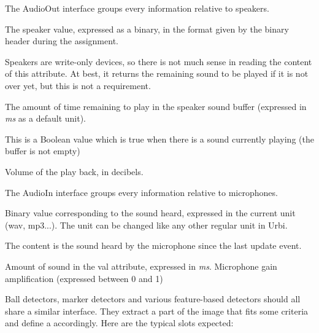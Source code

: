 The AudioOut interface groups every information relative to speakers.

\begin{slots}
  {%
    The speaker value, expressed as a binary, in the format given by
    the binary header during the assignment.

    Speakers are write-only devices, so there is not much sense in
    reading the content of this attribute. At best, it returns the
    remaining sound to be played if it is not over yet, but this is
    not a requirement.%
  }

  {%
    The amount of time remaining to play in the speaker sound buffer
    (expressed in \textit{ms} as a default unit).%
  }

  {%
    This is a Boolean value which is true when there is a sound
    currently playing (the buffer is not empty)%
  }

  {%
    Volume of the play back, in decibels.%
  }
\end{slots}




The AudioIn interface groups every information relative to microphones.

\begin{slots}
  {%
    Binary value corresponding to the sound heard, expressed in the
    current unit (wav, mp3...). The unit can be changed like any other
    regular unit in Urbi.

    The content is the sound heard by the microphone since the last
    update event.%
  }
  {%
    Amount of sound in the val attribute, expressed in \textit{ms}.%
  }
  {%
    Microphone gain amplification (expressed between 0 and 1)%
  }
\end{slots}



Ball detectors, marker detectors and various feature-based detectors
should all share a similar interface. They extract a part of the image
that fits some criteria and define a  accordingly. Here are
the typical slots expected:


